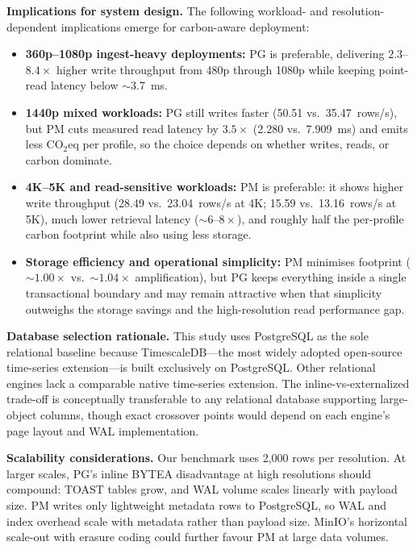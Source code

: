\documentclass[conference]{IEEEtran}
\begin{document}
\textbf{Implications for system design.} The following workload- and resolution-dependent implications emerge for carbon-aware deployment:
\begin{itemize}
    \item \textbf{360p--1080p ingest-heavy deployments:} PG is preferable, delivering $2.3$--$8.4\times$ higher write throughput from 480p through 1080p while keeping point-read latency below $\sim$3.7~ms.
    \item \textbf{1440p mixed workloads:} PG still writes faster (50.51 vs.\ 35.47~rows/s), but PM cuts measured read latency by $3.5\times$ (2.280 vs.\ 7.909~ms) and emits less CO$_2$eq per profile, so the choice depends on whether writes, reads, or carbon dominate.
    \item \textbf{4K--5K and read-sensitive workloads:} PM is preferable: it shows higher write throughput (28.49 vs.\ 23.04~rows/s at 4K; 15.59 vs.\ 13.16~rows/s at 5K), much lower retrieval latency ($\sim$$6$--$8\times$), and roughly half the per-profile carbon footprint while also using less storage.
    \item \textbf{Storage efficiency and operational simplicity:} PM minimises footprint ($\sim$$1.00\times$ vs.\ $\sim$$1.04\times$ amplification), but PG keeps everything inside a single transactional boundary and may remain attractive when that simplicity outweighs the storage savings and the high-resolution read performance gap.
\end{itemize}

\textbf{Database selection rationale.} This study uses PostgreSQL as the sole relational baseline because TimescaleDB---the most widely adopted open-source time-series extension---is built exclusively on PostgreSQL. Other relational engines lack a comparable native time-series extension. The inline-vs-externalized trade-off is conceptually transferable to any relational database supporting large-object columns, though exact crossover points would depend on each engine's page layout and WAL implementation.

\textbf{Scalability considerations.} Our benchmark uses 2,000 rows per resolution. At larger scales, PG's inline BYTEA disadvantage at high resolutions should compound: TOAST tables grow, and WAL volume scales linearly with payload size. PM writes only lightweight metadata rows to PostgreSQL, so WAL and index overhead scale with metadata rather than payload size. MinIO's horizontal scale-out with erasure coding could further favour PM at large data volumes.
\end{document}

